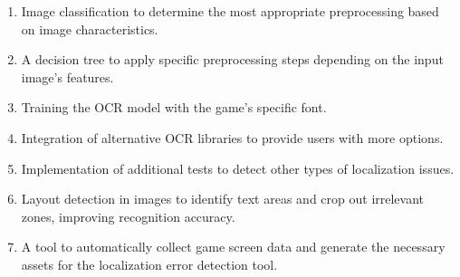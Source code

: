 \begin{enumerate}
	\item Image classification to determine the most appropriate preprocessing based on image characteristics.
	\item A decision tree to apply specific preprocessing steps depending on the input image’s features.
	\item Training the OCR model with the game’s specific font.
	\item Integration of alternative OCR libraries to provide users with more options.
	\item Implementation of additional tests to detect other types of localization issues.
	\item Layout detection in images to identify text areas and crop out irrelevant zones, improving recognition accuracy.
	\item A tool to automatically collect game screen data and generate the necessary assets for the localization error detection tool.
\end{enumerate}
